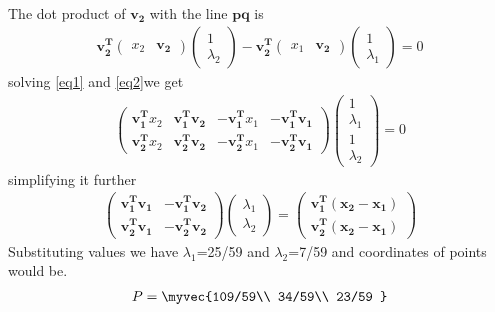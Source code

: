 \documentclass[journal,12pt,twocolumn]{IEEEtran}
\begin{document}
\begin{flushleft}
\begin{align}
\end{align}
The dot product of $\bm{v_2}$ with the line $\bm{pq}$ is\\
\begin{align}\label{eq2}
    \bm{v_2^T}\begin{pmatrix}x_2 & \bm{v_2}\end{pmatrix}\begin{pmatrix}1 \\ \lambda_2\end{pmatrix}-\bm{v_2^T}\begin{pmatrix}x_1 & \bm{v_2}\end{pmatrix}\begin{pmatrix}1 \\ \lambda_1\end{pmatrix}=0
\end{align}
solving  \ref{eq1} and \ref{eq2}we  get\\
\begin{align}
    \begin{pmatrix}\bm{v_1^T}x_2 & \bm{v_1^T}\bm{v_2} & -\bm{v_1^T}x_1 & -\bm{v_1^T}\bm{v_1}\\\bm{v_2^T}x_2 & \bm{v_2^T}\bm{v_2} & -\bm{v_2^T}x_1 & -\bm{v_2^T}\bm{v_1}\end{pmatrix}\begin{pmatrix}1\\\lambda_1\\1\\\lambda_2\end{pmatrix}=0
\end{align}
simplifying it further\\
\begin{align}
    \begin{pmatrix}\bm{v_1^T}\bm{v_1} & -\bm{v_1^T}\bm{v_2}\\\bm{v_2^T}\bm{v_1} &  -\bm{v_2^T}\bm{v_2}\end{pmatrix}\begin{pmatrix}\lambda_1\\\lambda_2\end{pmatrix}=\begin{pmatrix}\bm{v_1^T}\bm{(x_2-x_1)}\\\bm{v_2^T}\bm{(x_2-x_1)}\end{pmatrix}
\end{align}
Substituting  values  we have $\lambda_1$=25/59 and $\lambda_2$=7/59 and coordinates of points would be.
\begin{align}
P=\myvec{109/59\\
34/59\\
23/59
}
\end{align}
\end{flushleft}
\end{document}
